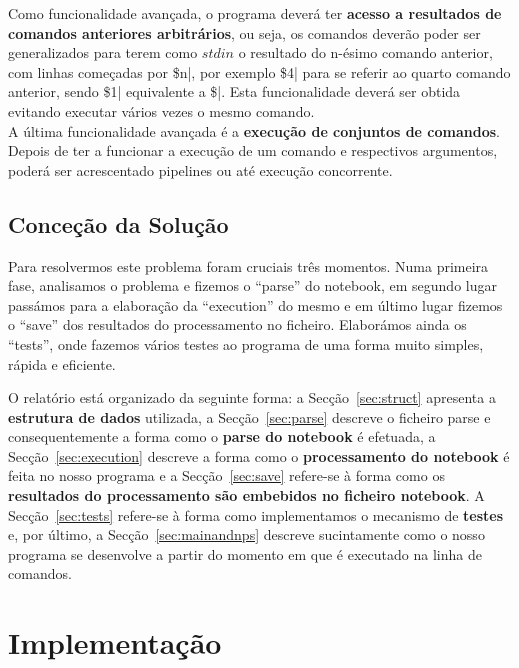 \documentclass[a4paper]{article}
\begin{document}
Como funcionalidade avançada, o programa deverá ter
\textbf{acesso a resultados de comandos anteriores arbitrários}, ou seja,
os comandos deverão poder ser generalizados para terem como $stdin$ o resultado
do n-ésimo comando anterior, com linhas começadas por \$n|, por exemplo \$4|
para se referir ao quarto comando anterior, sendo \$1| equivalente a \$|.
Esta funcionalidade deverá ser obtida evitando executar vários vezes o mesmo comando.\\

A última funcionalidade avançada é a \textbf{execução de conjuntos de comandos}.
Depois de ter a funcionar a execução de um comando
e respectivos argumentos, poderá ser acrescentado pipelines ou até execução concorrente.



\subsection{Conceção da Solução}
\label{sec:solucao}

Para resolvermos este problema foram cruciais três momentos. Numa primeira fase,
analisamos o problema e fizemos o ``parse'' do notebook, em segundo lugar passámos para
a elaboração da ``execution'' do mesmo e em último lugar fizemos o ``save'' dos resultados
do processamento no ficheiro. Elaborámos ainda os ``tests'', onde
fazemos vários testes ao programa de uma forma muito simples, rápida e eficiente.

O relatório está organizado da seguinte forma: a
Secção~\ref{sec:struct} apresenta a \textbf{estrutura de dados} utilizada, a
Secção~\ref{sec:parse} descreve o ficheiro parse e consequentemente a forma como
o \textbf{parse do notebook} é efetuada, a Secção~\ref{sec:execution} descreve a forma
como o \textbf{processamento do notebook} é feita no nosso programa
e a Secção~\ref{sec:save} refere-se à
forma como os \textbf{resultados do processamento são embebidos no ficheiro notebook}.
A Secção~\ref{sec:tests} refere-se à forma como implementamos o
mecanismo de \textbf{testes}
e, por último, a Secção~\ref{sec:mainandnps} descreve sucintamente
como o nosso programa se desenvolve a partir do momento em que é executado na linha
de comandos.



\section{Implementação}
\label{sec:implementacao}
\end{document}
